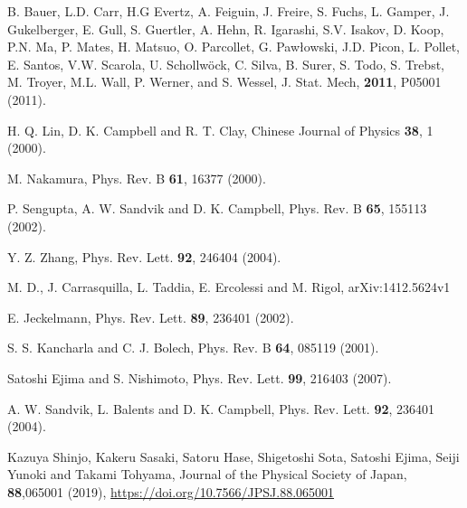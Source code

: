 \documentclass[prb,reprint,showpacs,twocolumn,superscriptaddress]{revtex4-2}
\begin{document}
\begin{thebibliography}{99}
 B. Bauer, L.D. Carr, H.G Evertz, A. Feiguin, J. Freire, S. Fuchs, L. Gamper, J. Gukelberger, E. Gull, S. Guertler, A. Hehn, R. Igarashi, S.V. Isakov, 
D. Koop, P.N. Ma, P. Mates, H. Matsuo, O. Parcollet, G. Paw{\l}owski, J.D. Picon, L. Pollet, E. Santos, V.W. Scarola, U. Schollw{\"o}ck, C. Silva, B. Surer, S. Todo, 
S. Trebst, M. Troyer, M.L. Wall, P. Werner,  and S. Wessel, J. Stat. Mech, {\bf 2011}, P05001 (2011).

 H. Q. Lin, D. K. Campbell and R. T. Clay, Chinese Journal of Physics
\textbf{38}, 1 (2000).

 M. Nakamura, Phys. Rev. B 
\textbf{61}, 16377 (2000).

 P. Sengupta, A. W. Sandvik and D. K. Campbell, Phys. Rev. B 
\textbf{65}, 155113 (2002).

 Y. Z. Zhang, Phys. Rev. Lett. 
\textbf{92}, 246404 (2004).

 M. D., J. Carrasquilla, L. Taddia, E. Ercolessi and M. Rigol, arXiv:1412.5624v1

 E. Jeckelmann, Phys. Rev. Lett. 
\textbf{89}, 236401 (2002).

 S. S. Kancharla and C. J. Bolech, 
Phys. Rev. B \textbf{64}, 085119 (2001).

 Satoshi Ejima and S. Nishimoto, Phys. Rev. Lett.
\textbf{99}, 216403 (2007).

 A. W. Sandvik, L. Balents and D. K. Campbell, Phys. Rev. Lett.
\textbf{92}, 236401 (2004).

 Kazuya Shinjo, Kakeru Sasaki, Satoru Hase, Shigetoshi Sota, Satoshi Ejima, Seiji Yunoki  and Takami Tohyama,
 Journal of the Physical Society of Japan,
\textbf{88},065001 (2019), \url{https://doi.org/10.7566/JPSJ.88.065001}


\end{thebibliography}
\end{document}

